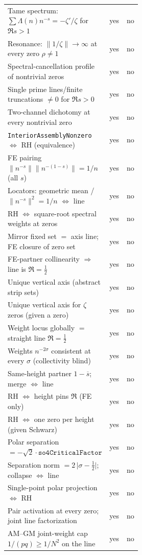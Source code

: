 \documentclass[11pt]{amsart}
\begin{document}
\begin{table}[h]
\begin{tabular}{@{}p{0.52\linewidth}cc@{}}
Tame spectrum: $\sum\Lambda(n)n^{-s}=-\zeta'/\zeta$ for $\Re s>1$ & yes & no \\
Resonance: $\lVert1/\zeta\rVert\to\infty$ at every zero $\rho\neq1$ & yes & no \\
Spectral-cancellation profile of nontrivial zeros & yes & no \\
Single prime lines/finite truncations $\neq0$ for $\Re s>0$ & yes & no \\
Two-channel dichotomy at every nontrivial zero & yes & no \\
\texttt{InteriorAssemblyNonzero} $\Leftrightarrow$ RH (equivalence) & yes & no \\
FE pairing $\lVert n^{-s}\rVert\lVert n^{-(1-s)}\rVert=1/n$ (all $s$) & yes & no \\
Locators: geometric mean / $\lVert n^{-s}\rVert^2=1/n$ $\Leftrightarrow$ line & yes & no \\
RH $\Leftrightarrow$ square-root spectral weights at zeros & yes & no \\
Mirror fixed set $=$ axis line; FE closure of zero set & yes & no \\
FE-partner collinearity $\Rightarrow$ line is $\Re=\tfrac12$ & yes & no \\
Unique vertical axis (abstract strip sets) & yes & no \\
Unique vertical axis for $\zeta$ zeros (given a zero) & yes & no \\
Weight locus globally $=$ straight line $\Re=\tfrac12$ & yes & no \\
Weights $n^{-2\sigma}$ consistent at every $\sigma$ (collectivity blind) & yes & no \\
Same-height partner $1-\overline{s}$; merge $\Leftrightarrow$ line & yes & no \\
RH $\Leftrightarrow$ height pins $\Re$ (FE only) & yes & no \\
RH $\Leftrightarrow$ one zero per height (given Schwarz) & yes & no \\
Polar separation $=-\sqrt2\cdot\texttt{so4CriticalFactor}$ & yes & no \\
Separation norm $=2\,\lvert\sigma-\tfrac12\rvert$; collapse $\Leftrightarrow$ line & yes & no \\
Single-point polar projection $\Leftrightarrow$ RH & yes & no \\
Pair activation at every zero; joint line factorization & yes & no \\
AM--GM joint-weight cap $1/(pq)\ge1/N^2$ on the line & yes & no \\

\end{tabular}
\end{table}
\end{document}
